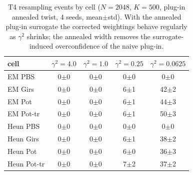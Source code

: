 \begin{table}[ht]
\centering
\caption{T4 resampling events by cell ($N=2048$, $K=500$, plug-in annealed twist, 4 seeds, mean$\pm$std).  With the annealed plug-in surrogate the corrected weightings behave regularly as $\gamma^2$ shrinks; the annealed width removes the surrogate-induced overconfidence of the naive plug-in.}
\label{tab:toy_t4_resamp}
\begin{tabular}{lcccc}
\toprule
cell & $\gamma^2=4.0$ & $\gamma^2=1.0$ & $\gamma^2=0.25$ & $\gamma^2=0.0625$ \\
\midrule
EM PBS & 0$\pm$0 & 0$\pm$0 & 0$\pm$0 & 0$\pm$0 \\
EM Girs & 0$\pm$0 & 0$\pm$0 & 6$\pm$1 & 42$\pm$2 \\
EM Pot & 0$\pm$0 & 0$\pm$0 & 6$\pm$1 & 44$\pm$3 \\
EM Pot-tr & 0$\pm$0 & 0$\pm$0 & 6$\pm$1 & 50$\pm$3 \\
Heun PBS & 0$\pm$0 & 0$\pm$0 & 0$\pm$0 & 0$\pm$0 \\
Heun Girs & 0$\pm$0 & 0$\pm$0 & 6$\pm$1 & 38$\pm$2 \\
Heun Pot & 0$\pm$0 & 0$\pm$0 & 6$\pm$0 & 36$\pm$3 \\
Heun Pot-tr & 0$\pm$0 & 0$\pm$0 & 7$\pm$2 & 37$\pm$2 \\
\bottomrule
\end{tabular}
\end{table}
